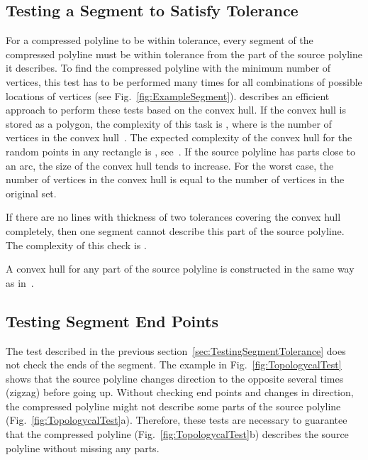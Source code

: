 \documentclass[conference]{IEEEtran}
\begin{document}
\subsection
{
  Testing a Segment to Satisfy Tolerance
  \label{sec:TestingSegmentTolerance}
}

For a compressed polyline to be within tolerance, every segment of the compressed polyline must be within tolerance from the part of the source polyline it describes. To find the compressed polyline with the minimum number of vertices, this test has to be performed many times for all combinations of possible locations of vertices (see Fig.~\ref{fig:ExampleSegment}). \cite{OptimizedCompressionAlgorithm} describes an efficient approach to perform these tests based on the convex hull. If the convex hull is stored as a polygon, the complexity of this task is , where  is the number of vertices in the convex hull~\cite{OptimizedCompressionAlgorithm}. The expected complexity of the convex hull for the  random points in any rectangle is , see~\cite{ConvexHullsComplexity}. If the source polyline has parts close to an arc, the size of the convex hull tends to increase. For the worst case, the number of vertices in the convex hull is equal to the number of vertices in the original set.

If there are no lines with thickness of two tolerances covering the convex hull completely, then one segment cannot describe this part of the source polyline. The complexity of this check is .

A convex hull for any part of the source polyline is constructed in the same way as in~\cite{OptimizedCompressionAlgorithm}.

\subsection
{
  Testing Segment End Points
  \label{sec:TestingSegmentEndPoints}
}

The test described in the previous section~\ref{sec:TestingSegmentTolerance} does not check the ends of the segment. The example in Fig.~\ref{fig:TopologycalTest} shows that the source polyline changes direction to the opposite several times (zigzag) before going up. Without checking end points and changes in direction, the compressed polyline might not describe some parts of the source polyline (Fig.~\ref{fig:TopologycalTest}a). Therefore, these tests are necessary to guarantee that the compressed polyline (Fig.~\ref{fig:TopologycalTest}b) describes the source polyline without missing any parts.
\end{document}
